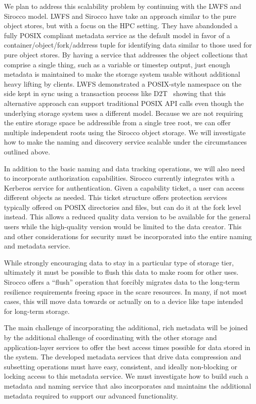 We plan to address this scalability problem by continuing with the LWFS and
Sirocco model. LWFS and Sirocco have take an approach similar to the pure
object stores, but with a focus on the HPC setting. They have abandonded a
fully POSIX compliant metadata service as the default model in favor of a
container/object/fork/addrress tuple for identifying data similar to those used
for pure object stores. By having a service that addresses the object
collections that comprise a single thing, such as a variable or timestep
output, just enough metadata is maintained to make the storage system usable
without additional heavy lifting by clients.  LWFS demonstrated a POSIX-style
namespace on the side kept in sync using a transaction process like
D2T~\cite{d2t} showing that this alternative approach can support traditional
POSIX API calls even though the underlying storage system uses a different
model. Because we are not requiring the entire storage space be addressible
from a single tree root, we can offer multiple independent roots using the
Sirocco object storage. We will investigate how to make the naming and
discovery service scalable under the circumstances outlined above.

In addition to the basic naming and data tracking operations, we will also need
to incorporate authorization capabilities. Sirocco currently integrates with a
Kerberos service for authentication. Given a capability ticket, a user can
access different objects as needed. This ticket structure offers protection
services typically offered on POSIX directories and files, but can do it at the
fork level instead. This allows a reduced quality data version to be available
for the general users while the high-quality version would be limited to the
data creator. This and other considerations for security must be incorporated
into the entire naming and metadata service.

While strongly encouraging data to stay in a particular type of storage tier,
ultimately it must be possible to flush this data to make room for other uses.
Sirocco offers a ``flush'' operation that forcibly migrates data to the
long-term resilience requirements freeing space in the scare resources. In
many, if not most cases, this will move data towards or actually on to a device
like tape intended for long-term storage.

The main challenge of incorporating the additional, rich metadata will be
joined by the additional challenge of coordinating with the other storage and
application-layer services to offer the best access times possible for data
stored in the system. The developed metadata services that drive data
compression and subsetting operations must have easy, consistent, and ideally
non-blocking or locking access to this metadata service. We must investigate
how to build such a metadata and naming service that also incorporates and
maintains the additional metadata required to support our advanced
functionality.

